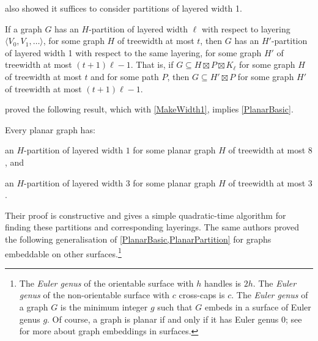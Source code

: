 \documentclass{patmorin}
\begin{document}
\citet{dujmovic.joret.ea:planar} also showed it suffices to consider partitions of layered width 1.

\begin{lem} 
\label{MakeWidth1}
If a graph $G$ has an $H$-partition of layered width $\ell$ with respect to layering $\langle V_0,V_1,\dots\rangle$, for some graph $H$ of treewidth at most $t$, then $G$ has an $H'$-partition of layered width 1 with respect to the same layering, for some graph $H'$ of treewidth at most $(t+1)\ell-1$.  That is, if $G\subseteq H\boxtimes P\boxtimes K_\ell$ for some graph $H$ of treewidth at most $t$  and for some path $P$, then $G\subseteq H' \boxtimes P$ for some graph $H'$ of treewidth at most $(t+1)\ell-1$.
\end{lem}

\citet{dujmovic.joret.ea:planar} proved the following result, which with \cref{MakeWidth1}, implies \cref{PlanarBasic}. 

\begin{thm}
\label{PlanarPartition}
Every planar graph has:
\begin{compactenum}[(a)]
\item an $H$-partition of layered width $1$ for some planar graph $H$ of treewidth at most $8$, and
\item an $H$-partition of layered width $3$ for some planar graph $H$ of treewidth at most $3$.
\end{compactenum}
\end{thm}
Their proof is constructive and gives a simple quadratic-time algorithm for finding these partitions and corresponding layerings.
%
%
The same authors proved the following generalisation of \cref{PlanarBasic,PlanarPartition} for graphs embeddable on other surfaces.\footnote{The \textit{Euler genus} of the orientable surface with $h$ handles is $2h$. The \textit{Euler genus} of the non-orientable surface with $c$ cross-caps is $c$. The \textit{Euler genus} of a graph $G$ is the minimum integer $g$ such that $G$ embeds in a surface of Euler genus $g$. Of course, a graph is planar if and only if it has Euler genus 0; see \citep{mohar.thomassen:graphs} for more about graph embeddings in surfaces.}
\end{document}

